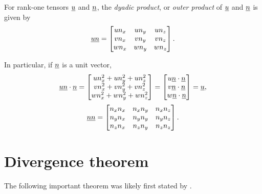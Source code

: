 \begin{definition}
For rank-one tensors $\underline{u}$ and $\underline{n}$, the \emph{dyadic product}, or \emph{outer product} of $\underline{u}$ and $\underline{n}$ is given by
\begin{align*}
  \underline{u} \underline{n} =
    \begin{bmatrix}
      u n_x & u n_y & u n_z \\
      v n_x & v n_y & v n_z \\
      w n_x & w n_y & w n_z
    \end{bmatrix}.
\end{align*}
\end{definition}

\begin{remark}
\label{dydadic_unit_vector_product}
In particular, if $\underline{n}$ is a unit vector,
\begin{align*}
  \underline{u} \underline{n} \cdot \underline{n} =
    \begin{bmatrix}
      u n_x^2 + u n_y^2 + u n_z^2 \\
      v n_x^2 + v n_y^2 + v n_z^2 \\
      w n_x^2 + w n_y^2 + w n_z^2
    \end{bmatrix} = 
    \begin{bmatrix}
      u \underline{n} \cdot \underline{n} \\
      v \underline{n} \cdot \underline{n} \\
      w \underline{n} \cdot \underline{n}
    \end{bmatrix}
    = \underline{u},
\end{align*}
\begin{align*}
  \underline{n} \underline{n} =
    \begin{bmatrix}
      n_x n_x & n_x n_y & n_x n_z \\
      n_y n_x & n_y n_y & n_y n_z \\
      n_z n_x & n_z n_y & n_z n_z
    \end{bmatrix}.
\end{align*}
\end{remark}

\section{Divergence theorem} \label{ssn_divergence_theorem}

The following important theorem was likely first stated by \citet{lagrange_1762}.


